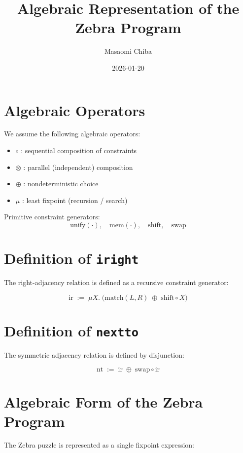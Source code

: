 \documentclass[12pt,a4paper]{article}
\title{Algebraic Representation of the Zebra Program}
\author{Masaomi Chiba}
\date{2026-01-20}
\begin{document}
\maketitle

\section*{Algebraic Operators}

We assume the following algebraic operators:

\begin{itemize}
  \item $\circ$ : sequential composition of constraints
  \item $\otimes$ : parallel (independent) composition
  \item $\oplus$ : nondeterministic choice
  \item $\mu$ : least fixpoint (recursion / search)
\end{itemize}

Primitive constraint generators:
\[
\mathrm{unify}(\cdot),\quad
\mathrm{mem}(\cdot),\quad
\mathrm{shift},\quad
\mathrm{swap}
\]

\section*{Definition of \texttt{iright}}

The right-adjacency relation is defined as a recursive constraint generator:

\[
\mathrm{ir}
\;:=\;
\mu X.\;
\Big(
  \mathrm{match}(L,R)
  \;\oplus\;
  \mathrm{shift} \circ X
\Big)
\]

\section*{Definition of \texttt{nextto}}

The symmetric adjacency relation is defined by disjunction:

\[
\mathrm{nt}
\;:=\;
\mathrm{ir}
\;\oplus\;
\mathrm{swap} \circ \mathrm{ir}
\]

\section*{Algebraic Form of the Zebra Program}

The Zebra puzzle is represented as a single fixpoint expression:
\end{document}
